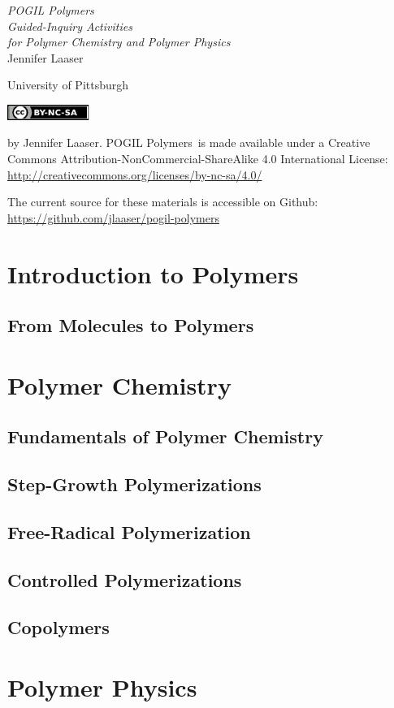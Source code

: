 \documentclass[letter,11pt,onecolumn]{memoir}
\date{\today}
\newcommand{\thetitle}{POGIL Polymers}
\newcommand*{\titlepage}{\begingroup%
\raggedleft
\vspace*{\baselineskip}
{\Huge\itshape POGIL Polymers}\\[\baselineskip]
{\large\itshape Guided-Inquiry Activities \\for Polymer Chemistry and Polymer Physics}\\[0.2\textheight]
{\Large Jennifer Laaser}\par
\vfill
{\Large  University of Pittsburgh}
\vspace*{\baselineskip}
\endgroup}
\newcommand*{\copyrightpage}{\begingroup
\makeatother
\vspace*{5in}
\includegraphics[width=0.2\textwidth]{by-nc-sa}

\vspace{0.2in}
	\begin{minipage}{0.75\textwidth}
		\textcopyright 2018 by Jennifer Laaser. \thetitle\ is made available under a Creative Commons Attribution-NonCommercial-ShareAlike 4.0 International License: \url{http://creativecommons.org/licenses/by-nc-sa/4.0/}

		\vspace{0.1in}

		The current source for these materials is accessible on Github:\\ 		\url{https://github.com/jlaaser/pogil-polymers}
	\end{minipage}
\vfill
\endgroup}
\begin{document}
\frontmatter
\pagestyle{empty}
\titlepage
\clearpage

\copyrightpage
\clearpage

\tableofcontents*
\clearpage



\mainmatter

\part{Introduction to Polymers}

	\chapter{From Molecules to Polymers}

\part{Polymer Chemistry}

	\chapter{Fundamentals of Polymer Chemistry}

	\chapter{Step-Growth Polymerizations}

	\chapter{Free-Radical Polymerization}

	\chapter{Controlled Polymerizations}

	\chapter{Copolymers}

\part{Polymer Physics}
\end{document}
